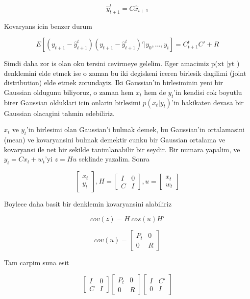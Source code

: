 \documentclass[12pt,fleqn]{article}
\begin{document}
\[ \hat{y}_{t+1}^t = C\hat{x}_{t+1} \]

Kovaryans icin benzer durum

\[ E[(y_{t+1}-\hat{y}_{t+1}^t)(y_{t+1}-\hat{y}_{t+1}^t)' | y_0,...,y_t] = 
C_{t+1}^t C' + R
 \]

 Simdi daha zor is olan oku tersini cevirmeye gelelim. Eger amacimiz p(xt
 |yt ) denklemini elde etmek ise o zaman bu iki degiskeni iceren birlesik
 dagilimi (joint distribution) elde etmek zorundayiz. Iki Gaussian'in
 birlesiminin yeni bir Gaussian oldugunu biliyoruz, o zaman hem $x_t$ hem
 de $y_t$'in kendisi cok boyutlu birer Gaussian olduklari icin onlarin
 birlesimi $p(x_t |y_t )$'in hakikaten devasa bir Gaussian olacagini tahmin
 edebiliriz.

$x_t$ ve $y_t$'in birlesimi olan Gaussian'i bulmak demek, bu Gaussian'in 
ortalamasini (mean) ve kovaryansini bulmak demektir cunku bir Gaussian 
ortalama ve kovaryansi ile net bir sekilde tanimlanabilir bir seydir. 
Bir numara yapalim, ve $y_t = Cx_t + w_t$'yi $z = Hu$ seklinde
yazalim. Sonra 

\[ 
\left[\begin{array}{r}
x_t \\
y_t
\end{array}\right], 
H = 
\left[\begin{array}{rr}
I & 0 \\
C & I
\end{array}\right], 
u = 
\left[\begin{array}{r}
x_t \\
w_t
\end{array}\right]
 \]

Boylece daha basit bir denklemin kovaryansini alabiliriz

\[ cov(z) = H \ cos(u) H' \]

\[ 
cov(u) = 
\left[\begin{array}{rr}
P_t & 0 \\
0 & R
\end{array}\right]
 \]

Tam carpim suna esit

\[ 
\left[\begin{array}{rr}
I & 0 \\
C & I
\end{array}\right]
\left[\begin{array}{rr}
P_t & 0 \\
0 & R
\end{array}\right]
\left[\begin{array}{rr}
I & C' \\
0 & I
\end{array}\right]
 \]
\end{document}

